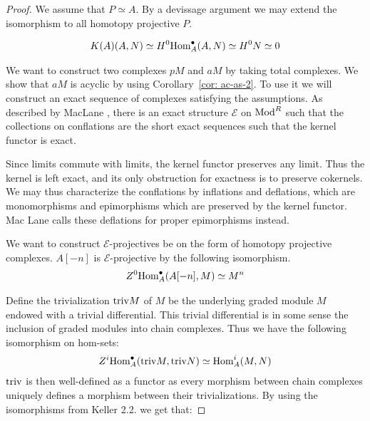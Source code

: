 \documentclass[../thesis.tex]{subfiles}
\begin{document}
            \begin{proof}
                We assume that $P \simeq A$. By a devissage argument we may extend the isomorphism to all homotopy projective $P$. 

                \begin{align*}
                    K(A)(A, N) \simeq H^0 {\tt{Hom}}^\bullet_A (A, N) \simeq H^0 N \simeq 0
                \end{align*}

                We want to construct two complexes $pM$ and $aM$ by taking total complexes. We show that $aM$ is acyclic by using Corollary~\ref{cor: ac-as-2}. To use it we will construct an exact sequence of complexes satisfying the assumptions. As described by MacLane \cite{MacLane94}, there is an exact structure $\mathcal{E}$ on $\tt{Mod}^R$ such that the collections on conflations are the short exact sequences such that the kernel functor is exact.
                \begin{center}
                \end{center}

                Since limits commute with limits, the kernel functor preserves any limit. Thus the kernel is left exact, and its only obstruction for exactness is to preserve cokernels. We may thus characterize the conflations by inflations and deflations, which are monomorphisms and epimorphisms which are preserved by the kernel functor. Mac Lane calls these deflations for proper epimorphisms instead.

                We want to construct $\mathcal{E}$-projectives be on the form of homotopy projective complexes. $A[-n]$ is $\mathcal{E}$-projective by the following isomorphism.
                \begin{align*}
                    Z^0\tt{Hom}_A^\bullet (A[-n], M) \simeq M^n
                \end{align*}

                Define the trivialization $\tt{triv}M$ of $M$ be the underlying graded module $M$ endowed with a trivial differential. This trivial differential is in some sense the inclusion of graded modules into chain complexes. Thus we have the following isomorphism on hom-sets:
                \begin{align*}
                    Z^i\tt{Hom}_A^\bullet(\tt{triv}M, \tt{triv}N) \simeq \tt{Hom}_A^i(M, N)
                \end{align*}
                $\tt{triv}$ is then well-defined as a functor as every morphism between chain complexes uniquely defines a morphism between their trivializations. By using the isomorphisms from Keller \cite{Keller94} 2.2. we get that:


\end{proof}
\end{document}
